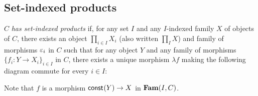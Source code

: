 \subsection{Set-indexed products}

$C$ \emph{has set-indexed products} if, for any set $I$ and any $I$-indexed family $X$ of objects of $C$,
there exists an object $\prod_{i \in I}X_i$ (also written $\prod_{I} X$) and family of morphisms $\varepsilon_i$ in
$C$ such that for any object $Y$ and any family of morphisms $\{f_i: Y \to X_i\}_{i \in I}$ in $C$, there
exists a unique morphism $\lambda f$ making the following diagram commute for every $i \in I$:

\begin{center}
\end{center}

Note that $f$ is a morphism $\mathsf{const}_{}(Y) \to X$ in $\mathbf{Fam}(I,C)$.
